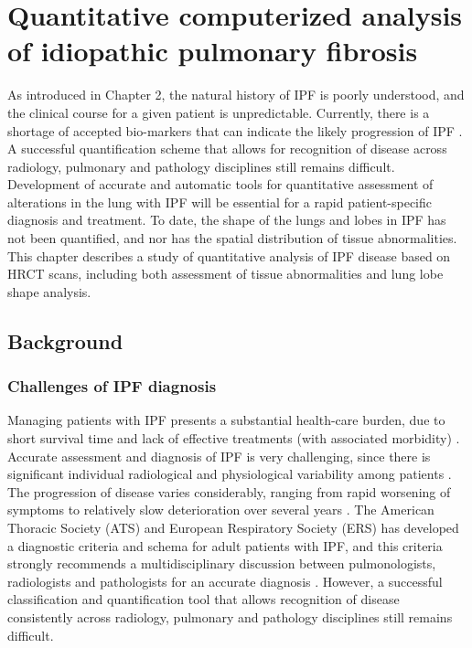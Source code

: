 \chapter{Quantitative computerized analysis of idiopathic pulmonary fibrosis} \label{Yuwen_QuantitiativeAnalysis}

As introduced in Chapter 2, the natural history of IPF is poorly understood, and the clinical course for a given patient is unpredictable. Currently, there is a shortage of accepted bio-markers that can indicate the likely progression of IPF \citep{bartholmai2013quantitative}. A successful quantification scheme that allows for recognition of disease across radiology, pulmonary and pathology disciplines still remains difficult. Development of accurate and automatic tools for quantitative assessment of alterations in the lung with IPF will be essential for a rapid patient-specific diagnosis and treatment. To date, the shape of the lungs and lobes in IPF has not been quantified, and nor has the spatial distribution of tissue abnormalities. This chapter describes a study of quantitative analysis of IPF disease based on HRCT scans, including both assessment of tissue abnormalities and lung lobe shape analysis. 

\section{Background}
\subsection{Challenges of IPF diagnosis} \label{Challenge}
Managing patients with IPF presents a substantial health-care burden, due to short survival time and lack of effective treatments (with associated morbidity) \citep{olson2007mortality,raghunath2014quantitative}. Accurate assessment and diagnosis of IPF is very challenging, since there is significant individual radiological and physiological variability among patients \citep{devaraj2014imaging}. The progression of disease varies considerably, ranging from rapid worsening of symptoms to relatively slow deterioration over several years \citep{king2011idiopathic,richeldi2017idiopathic}. The American Thoracic Society (ATS) and European Respiratory Society (ERS) has developed a diagnostic criteria and schema for adult patients with IPF, and this criteria strongly recommends a multidisciplinary discussion between pulmonologists, radiologists and pathologists for an accurate diagnosis \citep{raghu2011official,travis2013official}. However, a successful classification and quantification tool that allows recognition of disease consistently across radiology, pulmonary and pathology disciplines still remains difficult. 

